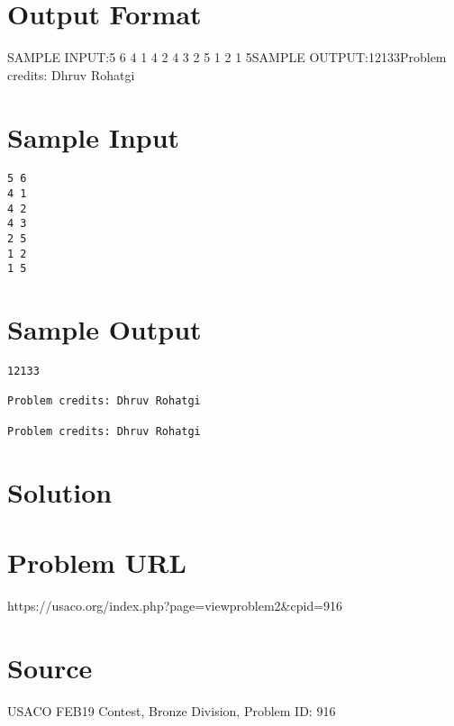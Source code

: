 \documentclass[12pt]{article}
\begin{document}
\section*{Output Format}
SAMPLE INPUT:5 6
4 1
4 2
4 3
2 5
1 2
1 5SAMPLE OUTPUT:12133Problem credits: Dhruv Rohatgi

\section*{Sample Input}
\begin{verbatim}
5 6
4 1
4 2
4 3
2 5
1 2
1 5
\end{verbatim}

\section*{Sample Output}
\begin{verbatim}
12133

Problem credits: Dhruv Rohatgi

Problem credits: Dhruv Rohatgi
\end{verbatim}

\section*{Solution}


\section*{Problem URL}
https://usaco.org/index.php?page=viewproblem2&cpid=916

\section*{Source}
USACO FEB19 Contest, Bronze Division, Problem ID: 916
\end{document}
